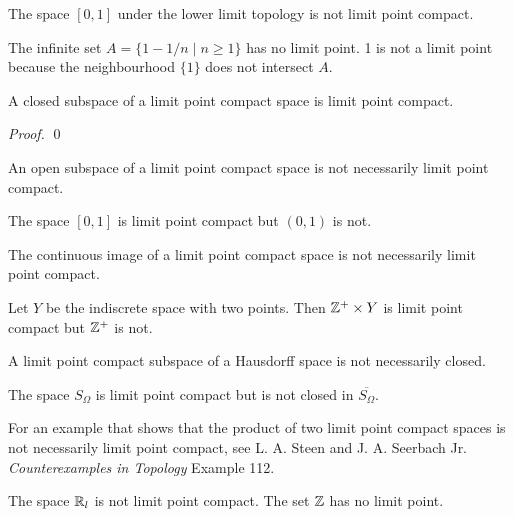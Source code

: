 \begin{example}
    The space $[0,1]$ under the lower limit topology is not limit point compact.

    The infinite set $A = \{ 1 - 1/n \mid n \geq 1 \}$ has no limit point. 1 is not a limit point
    because the neighbourhood $\{1\}$ does not intersect $A$.
\end{example}

\begin{proposition}
    A closed subspace of a limit point compact space is limit point compact.
\end{proposition}

\begin{proof}
    \pf
    \qed
\end{proof}

\begin{example}
    An open subspace of a limit point compact space is not necessarily limit point compact.

    The space $[0,1]$ is limit point compact but $(0,1)$ is not.
\end{example}

\begin{example}
    The continuous image of a limit point compact space is not necessarily limit point compact.

    Let $Y$ be the indiscrete space with two points. Then $\mathbb{Z}^+ \times Y$ is limit point compact but $\mathbb{Z}^+$
    is not.
\end{example}

\begin{example}
    A limit point compact subspace of a Hausdorff space is not necessarily closed.

    The space $S_\Omega$ is limit point compact but is not closed in $\overline{S_\Omega}$.
\end{example}

For an example that shows that the product of two limit point compact spaces is not necessarily
limit point compact, see L. A. Steen and J. A. Seerbach Jr. \emph{Counterexamples in
Topology} Example 112.

\begin{example}
    The space $\mathbb{R}_l$ is not limit point compact. The set $\mathbb{Z}$ has no limit point.
\end{example}

